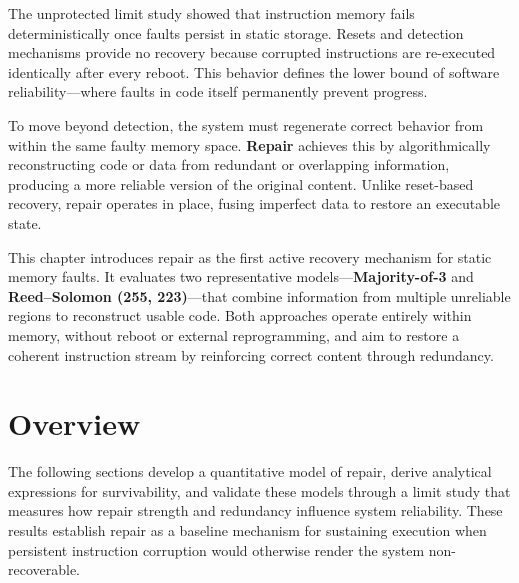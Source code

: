 The unprotected limit study showed that instruction memory fails deterministically once faults persist in static storage. 
Resets and detection mechanisms provide no recovery because corrupted instructions are re-executed identically after every reboot. 
This behavior defines the lower bound of software reliability—where faults in code itself permanently prevent progress.  

To move beyond detection, the system must regenerate correct behavior from within the same faulty memory space. 
\textbf{Repair} achieves this by algorithmically reconstructing code or data from redundant or overlapping information, 
producing a more reliable version of the original content. 
Unlike reset-based recovery, repair operates in place, fusing imperfect data to restore an executable state.  

This chapter introduces repair as the first active recovery mechanism for static memory faults. 
It evaluates two representative models—\textbf{Majority-of-3} and \textbf{Reed–Solomon (255, 223)}—that combine information from multiple unreliable regions to reconstruct usable code. 
Both approaches operate entirely within memory, without reboot or external reprogramming, and aim to restore a coherent instruction stream by reinforcing correct content through redundancy.  

\section{Overview}
\label{sec:repair-overview}

The following sections develop a quantitative model of repair, derive analytical expressions for survivability, 
and validate these models through a limit study that measures how repair strength and redundancy influence system reliability. 
These results establish repair as a baseline mechanism for sustaining execution when persistent instruction corruption 
would otherwise render the system non-recoverable.